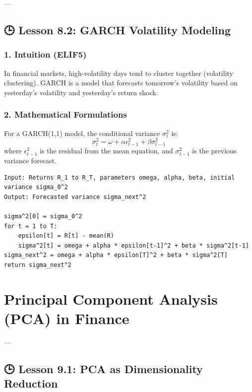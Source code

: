 \documentclass[11pt,oneside]{book}
\begin{document}
---

\section{🕒 Lesson 8.2: GARCH Volatility Modeling}

\subsection{1. Intuition (ELIF5)}
In financial markets, high-volatility days tend to cluster together (volatility clustering). GARCH is a model that forecasts tomorrow's volatility based on yesterday's volatility and yesterday's return shock.

\subsection{2. Mathematical Formulations}
For a GARCH(1,1) model, the conditional variance $\sigma_t^2$ is:
$$\sigma_t^2 = \omega + \alpha \epsilon_{t-1}^2 + \beta \sigma_{t-1}^2$$
where $\epsilon_{t-1}^2$ is the residual from the mean equation, and $\sigma_{t-1}^2$ is the previous variance forecast.

\begin{tcolorbox}[colback=white,colframe=black,boxrule=0.6pt,arc=0mm,title=GARCH(1,1) Volatility Forecast]
\begin{verbatim}
Input: Returns R_1 to R_T, parameters omega, alpha, beta, initial variance sigma_0^2
Output: Forecasted variance sigma_next^2

sigma^2[0] = sigma_0^2
for t = 1 to T:
    epsilon[t] = R[t] - mean(R)
    sigma^2[t] = omega + alpha * epsilon[t-1]^2 + beta * sigma^2[t-1]
sigma_next^2 = omega + alpha * epsilon[T]^2 + beta * sigma^2[T]
return sigma_next^2
\end{verbatim}
\end{tcolorbox}


\newpage

\chapter{Principal Component Analysis (PCA) in Finance}

---

\section{🕒 Lesson 9.1: PCA as Dimensionality Reduction}
\end{document}
